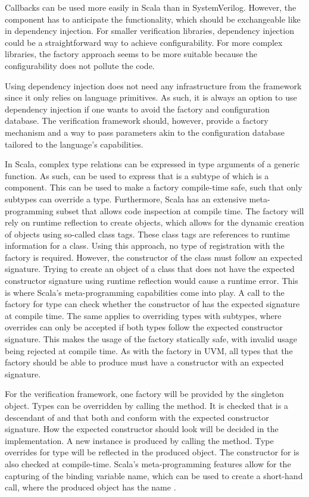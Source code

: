 Callbacks can be used more easily in Scala than in SystemVerilog. However, the component has to anticipate the
functionality, which should be exchangeable like in dependency injection. For smaller verification libraries, dependency injection could be a straightforward way to achieve configurability. For
more complex libraries, the factory approach seems to be more suitable because the configurability does not
pollute the code.

Using dependency injection does not need any infrastructure from the framework since it only relies on language
primitives. As such, it is always an option to use dependency injection if one wants to avoid the factory and
configuration database. The verification framework should, however, provide a factory mechanism and a way to pass parameters akin to the configuration database tailored to the language's capabilities.

In Scala, complex type relations can be expressed in type arguments of a generic function. As such, \ttt{[T <:
Component, R <: T]} can be used to express that  is a subtype of  which is a component. This can be used to make a factory compile-time safe, such that only subtypes can override a type. Furthermore, Scala has an extensive meta-programming subset that allows code inspection at compile time. The factory will rely on runtime reflection to create objects, which allows for the dynamic creation of objects using so-called class tags. These class tags are references to runtime information for a class. Using this approach, no type of registration with the factory is required. However, the constructor of the class must follow an expected signature. Trying to create an object of a class that does not have the expected constructor signature using runtime reflection would cause a runtime error. This is where Scala's meta-programming capabilities come into play. A call to the factory for type  can check whether the constructor of  has the expected signature at compile time. The same applies to overriding types with subtypes, where overrides can only be accepted if both types follow the expected constructor signature. This makes the usage of the factory statically safe, with invalid usage being rejected at compile time. As with the factory in UVM, all types that the factory should be able to produce must have a constructor with an expected signature.

For the verification framework, one factory will be provided by the  singleton object. Types can be overridden by calling the  method. It is checked that  is a descendant of  and that both  and  conform with the expected constructor signature. How the expected constructor should look will be decided in the implementation. A new instance is produced by calling the  method. Type overrides for type  will be reflected in the produced object. The constructor for  is also checked at compile-time. Scala's meta-programming features allow for the capturing of the binding variable name, which can be used to create a short-hand  call, where the produced object has the name .

